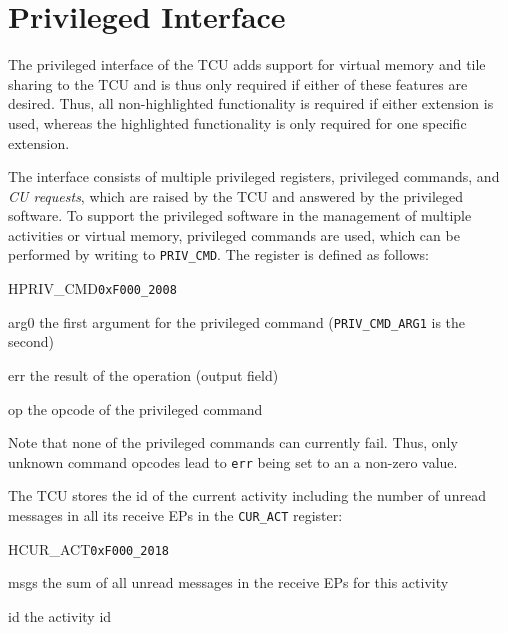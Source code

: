 \chapter{Privileged Interface}

The privileged interface of the TCU adds support for virtual memory and tile sharing to the TCU and is
thus only required if either of these features are desired. Thus, all non-highlighted functionality
is required if either extension is used, whereas the highlighted functionality is only required for
one specific extension.

The interface consists of multiple privileged registers, privileged commands, and \emph{CU
requests}, which are raised by the TCU and answered by the privileged software. To support the
privileged software in the management of multiple activities or virtual memory, privileged commands are
used, which can be performed by writing to \texttt{PRIV\_CMD}. The register is defined as follows:

\begin{register}{H}{PRIV\_CMD}{\texttt{0xF000\_2008}}
  \regnewline%
  \begin{regdesc}\begin{reglist}
    \item[arg0] the first argument for the privileged command (\texttt{PRIV\_CMD\_ARG1} is the second)
    \item[err] the result of the operation (output field)
    \item[op] the opcode of the privileged command
  \end{reglist}\end{regdesc}
\end{register}

\noindent Note that none of the privileged commands can currently fail. Thus, only unknown command
opcodes lead to \texttt{err} being set to an a non-zero value.

\noindent The TCU stores the id of the current activity including the number of unread messages in all
its receive EPs in the \texttt{CUR\_ACT} register:

\setlength{\regWidth}{.95\textwidth}
\begin{register}{H}{CUR\_ACT}{\texttt{0xF000\_2018}}
  \regnewline%
  \begin{regdesc}\begin{reglist}
    \item[msgs] the sum of all unread messages in the receive EPs for this activity
    \item[id] the activity id
  \end{reglist}\end{regdesc}
\end{register}
\setlength{\regWidth}{\textwidth}
\extend{}

